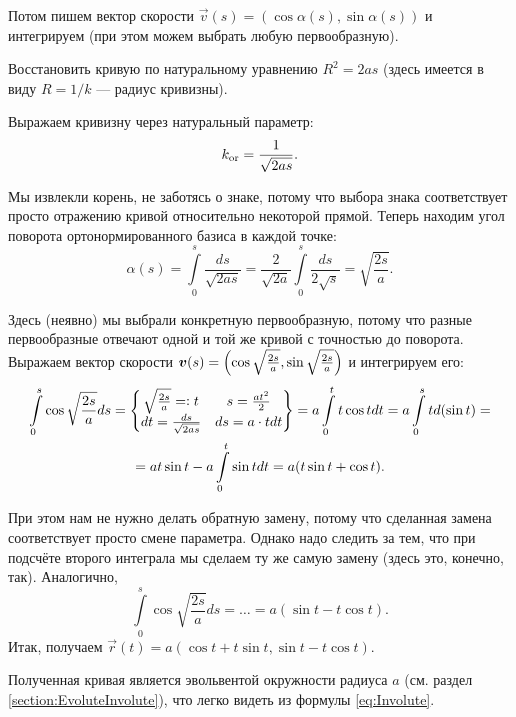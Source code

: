 Потом пишем вектор скорости $\vec{v}(s) = (\cos\alpha(s), \sin\alpha(s))$ и интегрируем (при этом можем выбрать любую первообразную).

\begin{problem} \label{problem:NaturalEquation}
	Восстановить кривую по натуральному уравнению $R^2 = 2as$ (здесь имеется в виду $R = 1 / k$ --- радиус кривизны).
\end{problem}

\begin{solution}
	Выражаем кривизну через натуральный параметр:
	\[
		k_{\mathrm{or}} = \frac{1}{\sqrt{2as}}.
	\]

	Мы извлекли корень, не заботясь о знаке, потому что выбора знака соответствует просто отражению кривой относительно некоторой прямой. Теперь находим угол поворота ортонормированного базиса в каждой точке:
	\[
		\alpha(s) = \int\limits_0^s\frac{ds}{\sqrt{2as}} = \frac{2}{\sqrt{2a}}\int\limits_0^s\frac{ds}{2\sqrt{s}} = \sqrt{\frac{2s}{a}}.
	\]

	Здесь (неявно) мы выбрали конкретную первообразную, потому что разные первообразные отвечают одной и той же кривой с точностью до поворота. Выражаем вектор скорости $\boldsymbol{v}(s) = \left(\cos\sqrt{\frac{2s}{a}}, \sin\sqrt{\frac{2s}{a}}\right)$ и интегрируем его:
	\begin{multline*}
		\int\limits_0^s\cos\sqrt{\frac{2s}{a}}ds = \left\{
			\begin{matrix}
				\sqrt{\frac{2s}{a}} = \vcentcolon t & s = \frac{at^2}{2} \\
				dt = \frac{ds}{\sqrt{2as}} & ds = a \cdot t dt
			\end{matrix}
			\right\} = a\int\limits_0^tt\cos t dt = a\int\limits_0^std(\sin t) =\\ = a t\sin t - a\int\limits_0^t\sin tdt = a(t\sin t + \cos t).
	\end{multline*}

	При этом нам не нужно делать обратную замену, потому что сделанная замена соответствует просто смене параметра. Однако надо следить за тем, что при подсчёте второго интеграла мы сделаем ту же самую замену (здесь это, конечно, так). Аналогично,
	\[
		\int\limits_0^s\cos\sqrt{\frac{2s}{a}}ds = \ldots = a(\sin t - t\cos t).
	\]
	Итак, получаем $\vec{r}(t) = a(\cos t + t \sin t, \sin t - t \cos t)$.
\end{solution}

Полученная кривая является эвольвентой окружности радиуса $a$ (см. раздел \ref{section:EvoluteInvolute}), что легко видеть из формулы \eqref{eq:Involute}.

